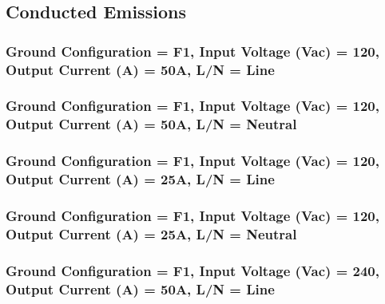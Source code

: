 \newpage
\subsection{Conducted Emissions}

\subsubsection{Ground Configuration = F1, Input Voltage (Vac) = 120, Output Current (A) = 50A, L/N = Line}

\begin{center}

\end{center}



\subsubsection{Ground Configuration = F1, Input Voltage (Vac) = 120, Output Current (A) = 50A, L/N = Neutral}

\begin{center}

\end{center}



\subsubsection{Ground Configuration = F1, Input Voltage (Vac) = 120, Output Current (A) = 25A, L/N = Line}

\begin{center}

\end{center}



\subsubsection{Ground Configuration = F1, Input Voltage (Vac) = 120, Output Current (A) = 25A, L/N = Neutral}

\begin{center}

\end{center}



\subsubsection{Ground Configuration = F1, Input Voltage (Vac) = 240, Output Current (A) = 50A, L/N = Line}

